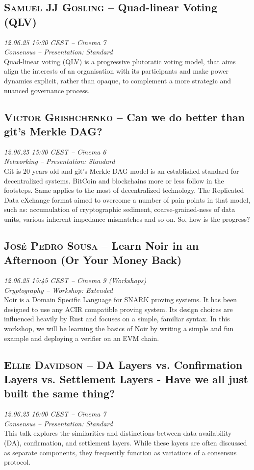 \clearpage
\subsection {\textsc{Samuel JJ Gosling}  -- Quad-linear Voting (QLV)} \noindent \textit {12.06.25 15:30 CEST -- Cinema 7\\ Consensus -- Presentation: Standard}\\[1em] Quad-linear voting (QLV) is a progressive plutoratic voting model, that aims align the interests of an organisation with its participants and make power dynamics explicit, rather than opaque, to complement a more strategic and nuanced governance process.

\clearpage
\subsection {\textsc{Victor Grishchenko}  -- Can we do better than git's Merkle DAG?} \noindent \textit {12.06.25 15:30 CEST -- Cinema 6\\ Networking -- Presentation: Standard}\\[1em] Git is 20 years old and git's Merkle DAG model is an established standard for decentralized systems. BitCoin and blockchains more or less follow in the footsteps. Same applies to the most of decentralized technology. The Replicated Data eXchange format aimed to overcome a number of pain points in that model, such as: accumulation of cryptographic sediment, coarse-grained-ness of data units, various inherent impedance mismatches and so on.
So, how is the progress?

\clearpage
\subsection {\textsc{José Pedro Sousa}  -- Learn Noir in an Afternoon (Or Your Money Back)} \noindent \textit {12.06.25 15:45 CEST -- Cinema 9 (Workshops)\\ Cryptography -- Workshop: Extended}\\[1em] Noir is a Domain Specific Language for SNARK proving systems. It has been designed to use any ACIR compatible proving system. Its design choices are influenced heavily by Rust and focuses on a simple, familiar syntax. In this workshop, we will be learning the basics of Noir by writing a simple and fun example and deploying a verifier on an EVM chain.

\clearpage
\subsection {\textsc{Ellie Davidson}  -- DA Layers vs. Confirmation Layers vs. Settlement Layers - Have we all just built the same thing?} \noindent \textit {12.06.25 16:00 CEST -- Cinema 7\\ Consensus -- Presentation: Standard}\\[1em] This talk explores the similarities and distinctions between data availability (DA), confirmation, and settlement layers. While these layers are often discussed as separate components, they frequently function as variations of a consensus protocol.

